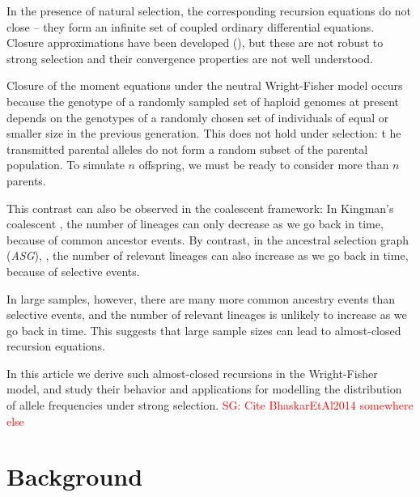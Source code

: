 \documentclass[review]{elsarticle}
\newcommand{\sgcomment}[1]{\textcolor{red}{SG: #1}}
\begin{document}
In the presence of natural selection, the corresponding recursion equations do not close \citep{Donnelly, JouganousEtAl2017} -- they form an infinite set of coupled ordinary differential equations. Closure approximations have been developed (\citep{JouganousEtAl2017}), but these are not robust to strong selection and their convergence properties are not well understood.

Closure of the moment equations under the neutral Wright-Fisher model occurs
 because the genotype of a randomly sampled set of haploid genomes at present
  depends on the genotypes of a randomly chosen set of individuals of equal
 or smaller size in the previous generation. This does not hold under selection: t
 he transmitted parental alleles do not form a random subset of the parental population. 
 To simulate $n$ offspring, we must be ready to consider more than $n$ parents. 
 
 This contrast can also be observed in the coalescent framework: 
 In Kingman's coalescent \citep{Kingman1982a}, the number of lineages can only decrease 
 as we go back in time, because of common ancestor events. By contrast, in the
  ancestral selection graph (\textit{ASG}), \citep{KroneNeuhauser1997}, the number of
  relevant lineages can also increase as we go back in time, because of selective events. 
 
 In large samples, however, there are many more common ancestry events than selective 
 events, and the number of relevant lineages is unlikely to increase as we go back in time. 
 This suggests that large sample sizes can lead to almost-closed recursion equations.  
 
In this article we derive such almost-closed recursions in the Wright-Fisher model, and study their behavior and applications for modelling the distribution of allele frequencies under strong selection. 
\sgcomment{Cite BhaskarEtAl2014 somewhere else}
 
 
 
  




\section{Background}
\label{sec:background}
\end{document}
